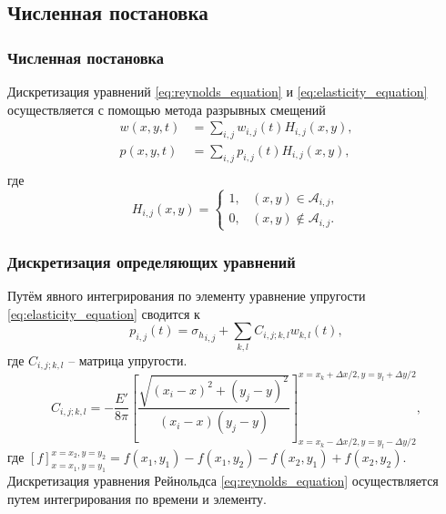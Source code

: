 \subsection{Численная постановка}
\begin{frame}
    \frametitle{Численная постановка}
    Дискретизация уравнений \eqref{eq:reynolds_equation} и \eqref{eq:elasticity_equation} осуществляется с помощью метода разрывных смещений
    \begin{equation}
        \label{eq:piecewiece_approximation}
        \begin{split}
            w(x,y,t) &= \sum\limits_{i,j} w_{i,j}(t) H_{i,j}(x,y), \\
            p(x,y,t) &= \sum\limits_{i,j} p_{i,j}(t) H_{i,j}(x,y), \\
        \end{split}
    \end{equation}
    где 
    \begin{equation}
        \label{eq:heaviside_function}
        H_{i,j}(x,y) = \left\{
            \begin{array}{ll}
                1, & (x,y) \in \mathcal{A}_{i,j}, \\
                0, & (x,y) \notin \mathcal{A}_{i,j}.
            \end{array}\right.
    \end{equation}
\end{frame}

\begin{frame}
    \frametitle{Дискретизация определяющих уравнений}
    Путём явного интегрирования по элементу уравнение упругости \eqref{eq:elasticity_equation} сводится к
    \begin{equation}
        \label{eq:discrete_elasticity}
        p_{i,j}(t) = {\sigma_h}_{i,j} + \sum\limits_{k,l} C_{i,j;k,l} w_{k,l}(t),
    \end{equation}
    где $C_{i,j;k,l}$ -- матрица упругости. 
    \begin{equation}
        \label{eq:homogeneous_matrix}
        C_{i,j;k,l} = -\frac{E'}{8\pi} \left[\frac{\sqrt{(x_i\!-\!x)^2 + (y_j\!-\!y)^2}}{(x_i\!-\!x)(y_j\!-\!y)} \right]_{x=x_k-\Delta x/2, y=y_l-\Delta y/2}^{x=x_k+\Delta x/2, y=y_l+\Delta y/2},
    \end{equation}
    где $[f]_{x=x_1, y=y_1}^{x=x_2, y=y_2} = f(x_1,y_1) - f(x_1,y_2) - f(x_2,y_1) + f(x_2,y_2)$. Дискретизация уравнения Рейнольдса \eqref{eq:reynolds_equation} осуществляется путем интегрирования по времени и элементу.
\end{frame}


